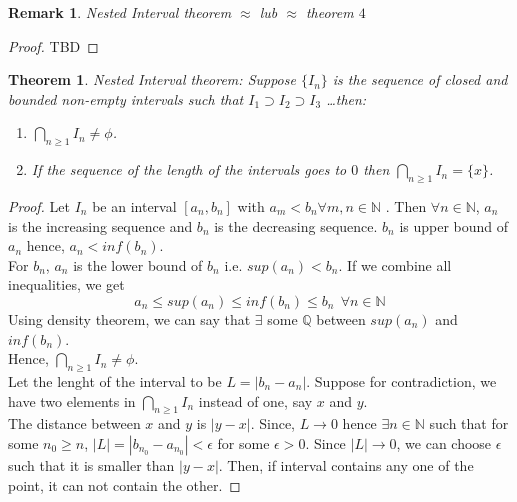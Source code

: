 \documentclass[12pt]{report}
\newtheorem{thm}{Theorem}
\newtheorem*{rem}{Remark}
\begin{document}
\begin{rem}
    Nested Interval theorem $\approx$ lub $\approx$ theorem $4$
\end{rem}
\begin{proof}
    TBD
\end{proof}
\begin{thm}
    Nested Interval theorem: Suppose $\{I_n\}$ is the sequence of closed and bounded non-empty intervals such that $I_1 \supset I_2 \supset I_3$ \dots then:
    \begin{enumerate}
        \item $\bigcap\limits_{n \geq 1} I_n \neq \phi$.
        \item If the sequence of the length of the intervals goes to $0$ then $\bigcap\limits_{n \geq 1} I_n = \{x\}$. 
    \end{enumerate}
\end{thm}

\begin{proof}
    Let $I_n$ be an interval $[a_n, b_n]$ with $a_m < b_n \forall m,n \in \mathbb{N}$ . Then $\forall n \in \mathbb{N}$, $a_n$ is the increasing sequence and $b_n$ is the decreasing sequence. $b_n$ is upper bound of $a_n$ hence, $a_n < inf(b_n)$.\\
    For $b_n$, $a_n$ is the lower bound of $b_n$ i.e. $sup(a_n)< b_n$. If we combine all inequalities, we get 
    $$ a_n \leq sup(a_n) \leq inf(b_n) \leq b_n ~~ \forall n \in \mathbb{N}$$
    Using density theorem, we can say that $\exists$ some $\mathbb{Q}$ between $sup(a_n)$ and $inf(b_n)$.\\
    Hence, $\bigcap\limits_{n \geq 1} I_n \neq \phi$.\\
    Let the lenght of the interval to be $L = |b_n - a_n|$. Suppose for contradiction, we have two elements in $\bigcap\limits_{n\geq 1}I_n$ instead of one, say $x$ and $y$. \\ The distance between $x$ and $y$ is $|y - x|$. Since, $L \to 0$ hence $\exists n \in \mathbb{N}$ such that for some $n_0 \geq n$, $|L| = |b_{n_0} - a_{n_0}|< \epsilon$ for some $\epsilon > 0$. Since $|L| \to 0$, we can choose $\epsilon$ such that it is smaller than $|y - x|$. Then, if interval contains any one of the point, it can not contain the other.
\end{proof}
\end{document}
